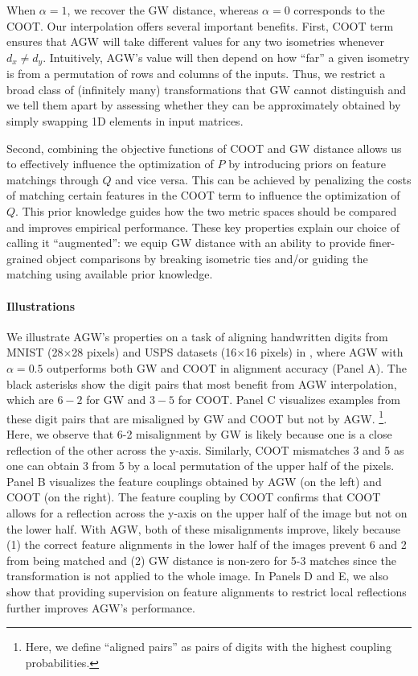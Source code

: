 When $\alpha = 1$, we recover the GW distance, whereas $\alpha = 0$ corresponds to the
COOT. Our interpolation offers several important benefits. First, COOT term ensures that AGW
will take different values for any two isometries whenever $d_x \neq d_y$. Intuitively,
AGW's value will then depend on how ``far'' a given isometry is from a permutation of rows
and columns of the inputs. Thus, we restrict a broad class of (infinitely many) transformations
that GW cannot distinguish and we tell them apart by assessing whether they
can be approximately obtained by simply swapping 1D elements in input matrices.

Second, combining the objective functions of COOT and GW distance allows us to
effectively influence the optimization of $P$ by introducing priors on feature matchings
through $Q$ and vice versa. This can be achieved by penalizing the costs of matching
certain features in the COOT term to influence the optimization of $Q$. This prior knowledge
guides how the two metric spaces should be compared and improves empirical performance.
These key properties explain our choice of calling it ``augmented'':
we equip GW distance with an ability to provide finer-grained object comparisons by
breaking isometric ties and/or guiding the matching using available prior knowledge.

\paragraph{Illustrations} We illustrate AGW's properties on a task of aligning handwritten digits
from MNIST \citep{lecun10} (28$\times$28 pixels) and USPS datasets (16$\times$16 pixels)
\citep{Hull94} in , where AGW with $\alpha=0.5$ outperforms both GW and COOT
in alignment accuracy (Panel A). The black asterisks show the digit pairs that most benefit
from AGW interpolation, which are $6-2$ for GW and $3-5$ for COOT.
Panel C visualizes examples from these digit pairs that are misaligned by GW and COOT
but not by AGW.
\footnote{Here, we define ``aligned pairs'' as pairs of digits with the
highest coupling probabilities.}. Here, we observe that 6-2 misalignment by GW is likely because
one is a close reflection of the other across the y-axis. Similarly,
COOT mismatches 3 and 5 as one can obtain 3 from 5 by a local permutation of
the upper half of the pixels. Panel B visualizes the feature couplings obtained by
AGW (on the left) and COOT (on the right). The feature coupling by COOT confirms that
COOT allows for a reflection across the y-axis on the upper half of the image
but not on the lower half. With AGW, both of these misalignments improve,
likely because (1) the correct feature alignments in the lower half of the images
prevent 6 and 2 from being matched and (2) GW distance is non-zero for 5-3 matches
since the transformation is not applied to the whole image. In Panels D and E,
we also show that providing supervision on feature alignments to restrict local reflections
further improves AGW's performance.


